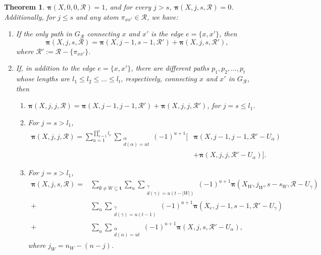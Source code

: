 \documentclass[12pt]{extarticle}
\newtheorem{Theorem}{Theorem}
\begin{document}
	\begin{Theorem}  $\bm{\pi}(X, 0,0,\mathcal{R})=1$, and for every $j>s$, $\bm{\pi}(X, j,s,\mathcal{R})=0$. Additionally, for $j\leq s$ and any atom $\pi_{xx'}\in\mathcal{R}$, we have:
		
		\begin{enumerate}
			\item If the only path in $G_{\mathcal{R}}$ connecting $x$ and $x'$ is the edge $e=\{x,x'\}$, then
			\begin{equation}
			 \bm{\pi}(X,j,s,\mathcal{R})=\bm{\pi}(X,j-1,s-1,\mathcal{R}')+ \bm{\pi}(X,j,s,\mathcal{R}'), 
			\end{equation}
			where $\mathcal{R}':=\mathcal{R}-\{\pi_{xx'}\}$.
			\item If, in addition to the edge $e=\{x,x'\}$, there are  different paths $p_1,p_2,\ldots,p_t$ whose lengths are $l_1\leq l_2\leq\ldots\leq l_t$, respectively, connecting $x$ and $x'$ in $G_{\mathcal{R}}$, then
			\begin{enumerate}
				\item $\bm{\pi}(X,j,j,\mathcal{R})=\bm{\pi}(X,j-1,j-1,\mathcal{R}')+ \bm{\pi}(X,j,j,\mathcal{R}')$, for $j=s\leq l_1$.\\
				\item For $j= s> l_1$,
				\begin{align*}
				\bm{\pi}(X, j, j, \mathcal{R}) = \sum_{u=1}^{\prod_{v=1}^t l_v} \sum_{\substack{\alpha \\ d(\alpha) = ut}} (-1)^{u+1} \Big[ 
				& \bm{\pi}(X, j-1, j-1, \mathcal{R}' - U_{\alpha}) \\
				& + \bm{\pi}(X, j, j, \mathcal{R}' - U_{\alpha}) 
				\Big].
				\end{align*} 
				
				\item For $j= s> l_1$, \begin{align*}
				\bm{\pi}(X, j, s, \mathcal{R}) = 
				& \sum_{\emptyset \neq W \subseteq \mathbf{t}} \sum_u \sum_{\substack{\gamma \\ d(\gamma) = u(t - |W|)}} (-1)^{u+1} 
				\bm{\pi}(X_W, j_W, s - s_W, \mathcal{R} - U_{\gamma}) \\
				+\, & \sum_u \sum_{\substack{\gamma \\ d(\gamma) = u(t - 1)}} (-1)^{u+1} 
				\bm{\pi}(X_e, j - 1, s - 1, \mathcal{R}' - U_{\gamma}) \\
				+\, & \sum_u \sum_{\substack{\alpha \\ d(\alpha) = ut}} (-1)^{u+1} 
				\bm{\pi}(X, j, s, \mathcal{R}' - U_{\alpha}),
				\end{align*}
				where $j_W=n_W-(n-j)$.
					\end{enumerate}
		\end{enumerate}
		
	\end{Theorem}
\end{document}

